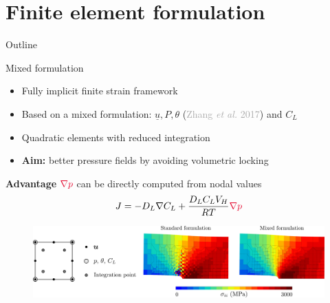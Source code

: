 \documentclass[9pt]{beamer}
\begin{document}
\section{Finite element formulation}

\begin{frame}{Outline}
	\tableofcontents[ 
    currentsubsection, 
    hideothersubsections, 
    sectionstyle=show/shaded, 
    subsectionstyle=show/shaded, 
    ] 
\end{frame}


\begin{frame}{Mixed formulation}

    \begin{itemize}
        \item Fully implicit finite strain framework
        \vspace{0.1cm}
        \item Based on a mixed formulation: $\underline{u}, P, \theta$ (\textcolor{darkgray}{Zhang \textit{et al.} 2017}) and $C_L$ 
        \vspace{0.1cm}
        \item Quadratic elements with reduced integration
        \vspace{0.1cm}
        \item \textbf{Aim:} better pressure fields by avoiding volumetric locking
    \end{itemize}

    \begin{block}{\textbf{Advantage}}
        $\textcolor{NewRed}{\nabla p}$ can be directly computed from nodal values
        \begin{equation*}
            J = {-D_L \nabla C_L} + {{\frac{D_L C_L V_H}{RT} \textcolor{NewRed}{\nabla p}}}
        \end{equation*} 
    \end{block}
    
    \vspace{0.1cm}
    
    \begin{figure}
        \centering
        \includegraphics[width=1.\textwidth]{Images/volumetric_locking.pdf}
    \end{figure}


\end{frame}
\end{document}
